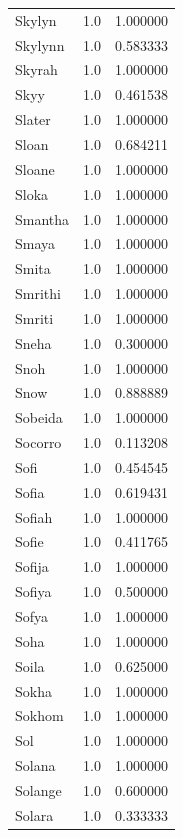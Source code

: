 \documentclass[
  letterpaper,
  DIV=11,
  numbers=noendperiod]{scrreprt}
\begin{document}
\begin{tabular}{lrr}
Skylyn          &   1.0 &   1.000000 \\
Skylynn         &   1.0 &   0.583333 \\
Skyrah          &   1.0 &   1.000000 \\
Skyy            &   1.0 &   0.461538 \\
Slater          &   1.0 &   1.000000 \\
Sloan           &   1.0 &   0.684211 \\
Sloane          &   1.0 &   1.000000 \\
Sloka           &   1.0 &   1.000000 \\
Smantha         &   1.0 &   1.000000 \\
Smaya           &   1.0 &   1.000000 \\
Smita           &   1.0 &   1.000000 \\
Smrithi         &   1.0 &   1.000000 \\
Smriti          &   1.0 &   1.000000 \\
Sneha           &   1.0 &   0.300000 \\
Snoh            &   1.0 &   1.000000 \\
Snow            &   1.0 &   0.888889 \\
Sobeida         &   1.0 &   1.000000 \\
Socorro         &   1.0 &   0.113208 \\
Sofi            &   1.0 &   0.454545 \\
Sofia           &   1.0 &   0.619431 \\
Sofiah          &   1.0 &   1.000000 \\
Sofie           &   1.0 &   0.411765 \\
Sofija          &   1.0 &   1.000000 \\
Sofiya          &   1.0 &   0.500000 \\
Sofya           &   1.0 &   1.000000 \\
Soha            &   1.0 &   1.000000 \\
Soila           &   1.0 &   0.625000 \\
Sokha           &   1.0 &   1.000000 \\
Sokhom          &   1.0 &   1.000000 \\
Sol             &   1.0 &   1.000000 \\
Solana          &   1.0 &   1.000000 \\
Solange         &   1.0 &   0.600000 \\
Solara          &   1.0 &   0.333333 \\

\end{tabular}
\end{document}
